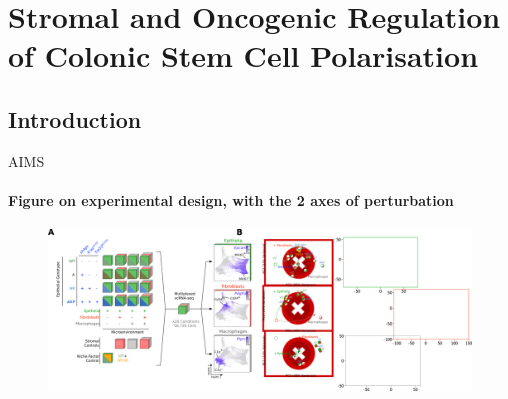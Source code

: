 \chapter{Stromal and Oncogenic Regulation of Colonic Stem Cell Polarisation}
\label{04seq}

\section{Introduction}


AIMS

\subsubsection{Figure on experimental design, with the 2 axes of perturbation}

\begin{figure}
    \centering
    \includegraphics{04seq/figs/4SEQ_ExpDesign.png}
    \caption{}
    \label{fig:}
\end{figure}

